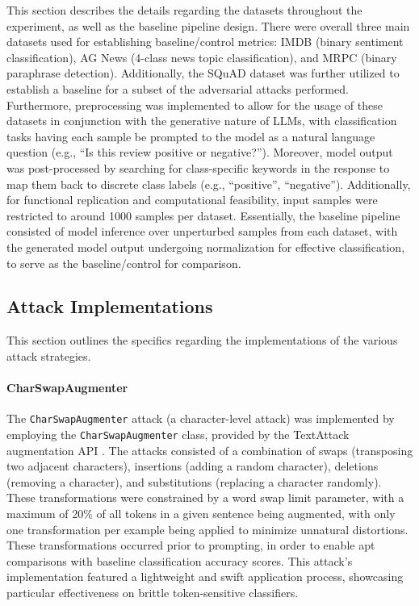 \documentclass[conference]{IEEEtran}
\begin{document}
This section describes the details regarding the datasets throughout the experiment, as well as the baseline pipeline design. There were overall three main datasets used for establishing baseline/control metrics: IMDB (binary sentiment classification), AG News (4-class news topic classification), and MRPC (binary paraphrase detection). Additionally, the SQuAD dataset was further utilized to establish a baseline for a subset of the adversarial attacks performed. Furthermore, preprocessing was implemented to allow for the usage of these datasets in conjunction with the generative nature of LLMs, with classification tasks having each sample be prompted to the model as a natural language question (e.g., ``Is this review positive or negative?''). Moreover, model output was post-processed by searching for class-specific keywords in the response to map them back to discrete class labels (e.g., ``positive'', ``negative''). Additionally, for functional replication and computational feasibility, input samples were restricted to around 1000 samples per dataset. Essentially, the baseline pipeline consisted of model inference over unperturbed samples from each dataset, with the generated model output undergoing normalization for effective classification, to serve as the baseline/control for comparison.

\subsection{Attack Implementations}

This section outlines the specifics regarding the implementations of the various attack strategies.

\paragraph{CharSwapAugmenter}
The \texttt{CharSwapAugmenter} attack (a character-level attack) was implemented by employing the \texttt{CharSwapAugmenter} class, provided by the TextAttack augmentation API \cite{textattack2020framework}. The attacks consisted of a combination of swaps (transposing two adjacent characters), insertions (adding a random character), deletions (removing a character), and substitutions (replacing a character randomly). These transformations were constrained by a word swap limit parameter, with a maximum of 20\% of all tokens in a given sentence being augmented, with only one transformation per example being applied to minimize unnatural distortions. These transformations occurred prior to prompting, in order to enable apt comparisons with baseline classification accuracy scores. This attack’s implementation featured a lightweight and swift application process, showcasing particular effectiveness on brittle token-sensitive classifiers.
\end{document}
